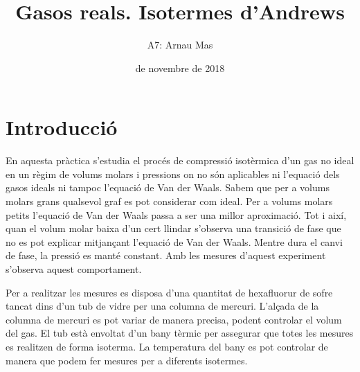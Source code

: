 \documentclass[12pt]{article}
\title{\sffamily {\bfseries Informe IV:} Gasos reals. Isotermes d'Andrews}
\author{\sffamily A7: Arnau Mas}
\date{\sffamily 12 de novembre de 2018}
\numberwithin{table}{section}
\numberwithin{figure}{section}
\numberwithin{equation}{section}
\begin{document}
\maketitle
\section{Introducció}
En aquesta pràctica s'estudia el procés de compressió isotèrmica d'un gas no ideal en un règim de volums molars i pressions on no són aplicables ni l'equació dels gasos ideals ni tampoc l'equació de Van der Waals. Sabem que per a volums molars grans qualsevol graf es pot considerar com ideal. Per a volums molars petits l'equació de Van der Waals passa a ser una millor aproximació. Tot i així, quan el volum molar baixa d'un cert llindar s'observa una transició de fase que no es pot explicar mitjançant l'equació de Van der Waals. Mentre dura el canvi de fase, la pressió es manté constant. Amb les mesures d'aquest experiment s'observa aquest comportament.    

Per a realitzar les mesures es disposa d'una quantitat de hexafluorur de sofre tancat dins d'un tub de vidre per una columna de mercuri. L'alçada de la columna de mercuri es pot variar de manera precisa, podent controlar el volum del gas. El tub està envoltat d'un bany tèrmic per assegurar que totes les mesures es realitzen de forma isoterma. La temperatura del bany es pot controlar de manera que podem fer mesures per a diferents isotermes. 
\end{document}
